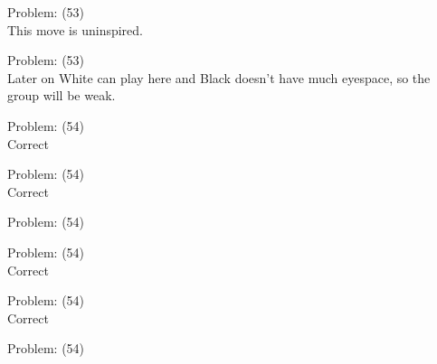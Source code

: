 \documentclass[11pt]{article}
\begin{document}
\begin{minipage}[t]{0.5\textwidth}
  {\centering
  
Problem: (53)\\
This move is uninspired.\\
  }
\end{minipage}
\begin{minipage}[t]{0.5\textwidth}
  {\centering
  
Problem: (53)\\
Later on White can play here and Black doesn't have much eyespace, so the group will be weak.\\
  }
\end{minipage}
\begin{minipage}[t]{0.5\textwidth}
  {\centering
  
Problem: (54)\\
Correct\\
  }
\end{minipage}
\begin{minipage}[t]{0.5\textwidth}
  {\centering
  
Problem: (54)\\
Correct\\
  }
\end{minipage}
\begin{minipage}[t]{0.5\textwidth}
  {\centering
  
Problem: (54)\\
  }
\end{minipage}
\begin{minipage}[t]{0.5\textwidth}
  {\centering
  
Problem: (54)\\
Correct\\
  }
\end{minipage}
\begin{minipage}[t]{0.5\textwidth}
  {\centering
  
Problem: (54)\\
Correct\\
  }
\end{minipage}
\begin{minipage}[t]{0.5\textwidth}
  {\centering
  
Problem: (54)\\
  }
\end{minipage}
\end{document}
